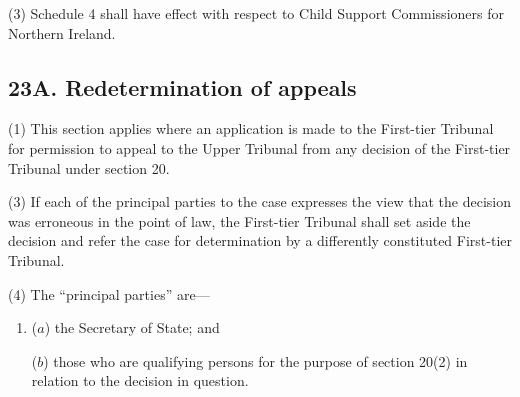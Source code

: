 \documentclass[a4paper]{article}
\begin{document}
(3)
Schedule 4 shall have effect with respect to Child Support Commissioners for Northern Ireland.

%


\subsection{23A. Redetermination of appeals}

(1) This section applies where an application is made to the First-tier Tribunal for permission to appeal to the Upper Tribunal from any decision of the First-tier Tribunal under section 20.

(3) If each of the principal parties to the case expresses the view that the decision was erroneous in the point of law, the First-tier Tribunal shall set aside the decision and refer the case for determination by a differently constituted First-tier Tribunal.

(4) The “principal parties” are---
\begin{enumerate}\item[]
($a$) the Secretary of State; and

($b$) those who are qualifying persons for the purpose of section 20(2) in relation
to the decision in question.
\end{enumerate}
\end{document}
